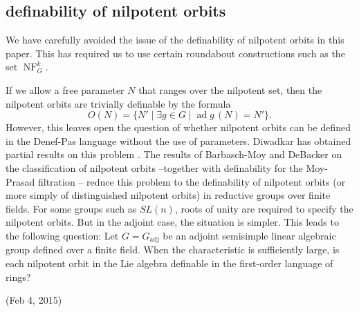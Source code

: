 \documentclass[12pt]{amsart}
\newcommand{\op}[1]{\operatorname{#1}}
\def\NF{\op{NF}}
\theoremstyle{plain}
\theoremstyle{definition}
\begin{document}
\subsection{definability of nilpotent orbits}

We have carefully avoided the issue of the definability of nilpotent
orbits in this paper.  This has required us to use certain roundabout
constructions such as the set $\NF^k_G$.

If we allow a free parameter $N$ that ranges over the nilpotent set,
then the nilpotent orbits are trivially definable by the formula
\[
O(N) = \{N' \mid \exists g\in G\mid \op{ad}g\,(N) = N' \}.
\]  
However, this leaves open the question of whether nilpotent orbits can
be defined in the Denef-Pas language without the use of parameters.
Diwadkar has obtained partial results on this problem \cite{diwadkar2006nilpoten}.  The
results of Barbasch-Moy and DeBacker on the classification of
nilpotent orbits --together with definability for the Moy-Prasad filtration
\cite{CGH} -- reduce this problem to the definability of nilpotent
orbits (or more simply of distinguished nilpotent orbits) in reductive
groups over finite fields.  For some groups such as $SL(n)$, roots of
unity are required to specify the nilpotent orbits.  But in the
adjoint case, the situation is simpler. This leads to the following
question: Let $G=G_{\op{adj}}$ be an adjoint semisimple linear algebraic
group defined over a finite field.  When the characteristic is
sufficiently large, is each nilpotent orbit in the Lie algebra
definable in the first-order language of rings?




(Feb 4, 2015)
\end{document}
